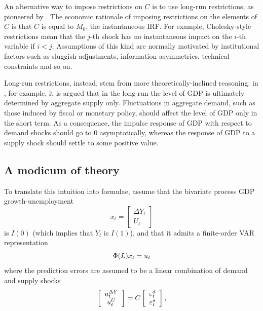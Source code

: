 \documentclass[a4paper,10pt]{article}
\newcommand{\PrE}[1]{\ensuremath u_{#1}} %
\newcommand{\StS}[1]{\ensuremath \varepsilon_{#1}} %
\newcommand{\VarSym}{\ensuremath \Phi}
\begin{document}
An alternative way to impose restrictions on $C$ is to use long-run
restrictions, as pioneered by \cite{BlanQuah1}. The economic
rationale of imposing restrictions on the elements of $C$ is that $C$
is equal to $M_0$, the instantaneous IRF. For example, Cholesky-style
restrictions mean that the $j$-th shock has no instantaneous impact on
the $i$-th variable if $i<j$. Assumptions of this kind are normally
motivated by institutional factors such as sluggish adjustments,
information asymmetries, technical constraints and so on.

Long-run restrictions, instead, stem from more theoretically-inclined
reasoning: in \cite{BlanQuah1}, for example, it is argued that in the
long run the level of GDP is ultimately determined by aggregate supply
only. Fluctuations in aggregate demand, such as those induced by
fiscal or monetary policy, should affect the level of GDP only in the
short term. As a consequence, the impulse response of GDP with respect
to demand shocks should go to 0 asymptotically, whereas the response
of GDP to a supply shock should settle to some positive value.

\subsection{A modicum of theory}
To translate this intuition into formulae, assume that the bivariate
process GDP growth-unemployment
\[
  x_t = \left[ \begin{array}{c} \Delta Y_t \\ U_t  \end{array}\right]
\]
is $I(0)$ (which implies that $Y_t$ is $I(1)$), and that it admits a
finite-order VAR representation
\[
  \VarSym(L) x_t = \PrE{t} 
\]
where the prediction errors are assumed to be a linear combination of
demand and supply shocks
\[
  \left[ \begin{array}{c} \PrE{t}^{\Delta Y} \\ \PrE{t}^U  \end{array}\right] 
  = 
  C \left[ \begin{array}{c} \StS{t}^d \\ \StS{t}^s  \end{array}\right] ,
\]
\end{document}
